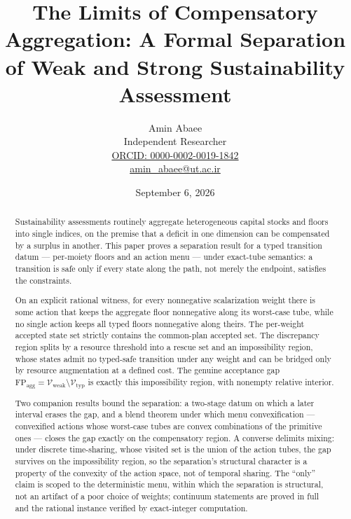 \documentclass[11pt]{article}
\begin{document}
\title{The Limits of Compensatory Aggregation: A Formal Separation of Weak and Strong Sustainability Assessment}
\author{Amin Abaee\\[0.35em]
{\small Independent Researcher}\\[0.55em]
{\small\href{https://orcid.org/0000-0002-0019-1842}{ORCID: 0000-0002-0019-1842}}\\[0.3em]
{\small\href{mailto:amin\_abaee@ut.ac.ir}{amin\_abaee@ut.ac.ir}}}
\date{September 6, 2026}
\maketitle

\begin{abstract}


Sustainability assessments routinely aggregate heterogeneous capital
stocks and floors into single indices, on the premise that a deficit in
one dimension can be compensated by a surplus in another. This paper
proves a separation result for a typed transition datum --- per-moiety
floors and an action menu --- under exact-tube semantics: a transition
is safe only if every state along the path, not merely the endpoint,
satisfies the constraints.

On an explicit rational witness, for every nonnegative scalarization
weight there is some action that keeps the aggregate floor nonnegative
along its worst-case tube, while no single action keeps all typed floors
nonnegative along theirs. The per-weight accepted state set strictly
contains the common-plan accepted set. The discrepancy region splits by
a resource threshold into a rescue set and an impossibility region,
whose states admit no typed-safe transition under any weight and can be
bridged only by resource augmentation at a defined cost. The genuine
acceptance gap
\(\mathrm{FP}_{\mathrm{agg}} = \mathcal{V}_{\mathrm{weak}} \setminus \mathcal{V}_{\mathrm{typ}}\)
is exactly this impossibility region, with nonempty relative interior.

Two companion results bound the separation: a two-stage datum on which a
later interval erases the gap, and a blend theorem under which menu
convexification --- convexified actions whose worst-case tubes are
convex combinations of the primitive ones --- closes the gap exactly on
the compensatory region. A converse delimits mixing: under discrete
time-sharing, whose visited set is the union of the action tubes, the
gap survives on the impossibility region, so the separation's structural
character is a property of the convexity of the action space, not of
temporal sharing. The ``only'' claim is scoped to the deterministic
menu, within which the separation is structural, not an artifact of a
poor choice of weights; continuum statements are proved in full and the
rational instance verified by exact-integer computation.

\end{abstract}
\end{document}
